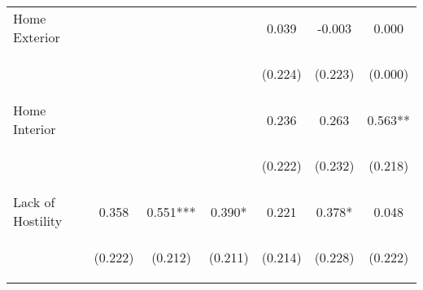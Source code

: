 \begin{tabular}{lcccccc}
\noalign{\smallskip}Home Exterior &  &  &  & 0.039 & -0.003 & 0.000\\
 & \begin{footnotesize}\end{footnotesize} & \begin{footnotesize}\end{footnotesize} & \begin{footnotesize}\end{footnotesize} & \begin{footnotesize}(0.224)\end{footnotesize} & \begin{footnotesize}(0.223)\end{footnotesize} & \begin{footnotesize}(0.000)\end{footnotesize}\\
\noalign{\smallskip}Home Interior &  &  &  & 0.236 & 0.263 & 0.563**\\
 & \begin{footnotesize}\end{footnotesize} & \begin{footnotesize}\end{footnotesize} & \begin{footnotesize}\end{footnotesize} & \begin{footnotesize}(0.222)\end{footnotesize} & \begin{footnotesize}(0.232)\end{footnotesize} & \begin{footnotesize}(0.218)\end{footnotesize}\\
\noalign{\smallskip}Lack of Hostility & 0.358 & 0.551*** & 0.390* & 0.221 & 0.378* & 0.048\\
 & \begin{footnotesize}(0.222)\end{footnotesize} & \begin{footnotesize}(0.212)\end{footnotesize} & \begin{footnotesize}(0.211)\end{footnotesize} & \begin{footnotesize}(0.214)\end{footnotesize} & \begin{footnotesize}(0.228)\end{footnotesize} & \begin{footnotesize}(0.222)\end{footnotesize}\\

\end{tabular}
